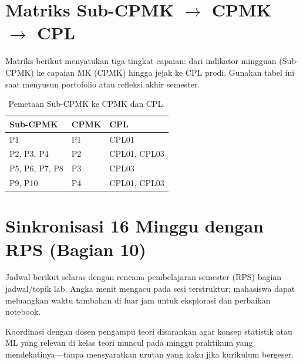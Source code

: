 \documentclass[../main.tex]{subfiles}
\begin{document}
\section{\texorpdfstring{Matriks Sub-CPMK $\rightarrow$ CPMK $\rightarrow$ CPL}{Matriks Sub-CPMK ke CPMK ke CPL}}

Matriks berikut menyatukan tiga tingkat capaian: dari indikator mingguan (Sub-CPMK) ke capaian MK (CPMK) hingga jejak ke CPL prodi. Gunakan tabel ini saat menyusun portofolio atau refleksi akhir semester.

\begin{table}[htbp]
\centering
\caption{Pemetaan Sub-CPMK ke CPMK dan CPL.}
\label{tab:matriks-obe}
\begin{tabular}{@{}lll@{}}
\toprule
\textbf{Sub-CPMK} & \textbf{CPMK} & \textbf{CPL} \\
\midrule
P1 & P1 & CPL01 \\
P2, P3, P4 & P2 & CPL01, CPL03 \\
P5, P6, P7, P8 & P3 & CPL03 \\
P9, P10 & P4 & CPL01, CPL03 \\
\bottomrule
\end{tabular}
\end{table}

\section{Sinkronisasi 16 Minggu dengan RPS (Bagian 10)}

Jadwal berikut selaras dengan rencana pembelajaran semester (RPS) bagian jadwal/topik lab. Angka menit mengacu pada sesi terstruktur; mahasiswa dapat meluangkan waktu tambahan di luar jam untuk eksplorasi dan perbaikan notebook.

Koordinasi dengan dosen pengampu teori disarankan agar konsep statistik atau ML yang relevan di kelas teori muncul pada minggu praktikum yang mendekatinya---tanpa mensyaratkan urutan yang kaku jika kurikulum bergeser.
\end{document}
